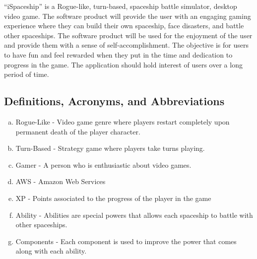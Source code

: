 \documentclass[]{article}
\begin{document}
	
 “iSpaceship” is a Rogue-like, turn-based, spaceship battle simulator, desktop video game. The software product will provide the user with an engaging gaming experience where they can build their own spaceship, face disasters, and battle other spaceships. 	The software product will be used for the enjoyment of the user and provide them with a sense of self-accomplishment. The objective is for users to have fun and feel rewarded when they put in the time and dedication to progress in the game. The application should hold interest of users over a long period of time.
	


\subsection{Definitions, Acronyms, and Abbreviations}
\label{sub:definitions_acronyms_and_abbreviations}
\begin{enumerate}[a)]
	
	\item Rogue-Like - Video game genre where players restart completely upon permanent death of the player character.
 
    \item Turn-Based - Strategy game where players take turns playing.
    
    \item Gamer - A person who is enthusiastic about video games. 
    
    \item AWS - Amazon Web Services
    
    \item XP - Points associated to the progress of the player in the game 
    
    \item Ability - Abilities are special powers that allows each spaceship to battle with other spaceships.
    
	\item Components - Each component is used to improve the power that comes along with each ability. 
	
\end{enumerate}
\end{document}
